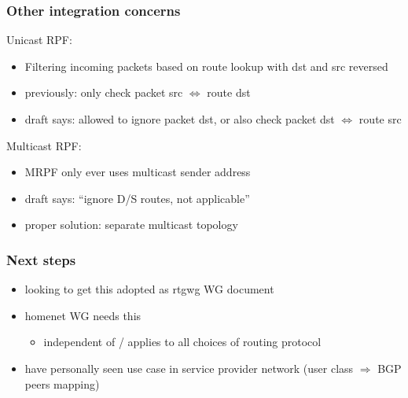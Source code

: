 \documentclass[14pt]{beamer}
\begin{document}
\begin{frame}
  \frametitle{Other integration concerns}

  Unicast RPF:
  \begin{itemize}
    \item Filtering incoming packets based on route lookup with dst and src reversed
    \item previously: only check packet src $\Leftrightarrow$ route dst
    \item draft says: allowed to ignore packet dst, or also check packet dst $\Leftrightarrow$ route src
  \end{itemize}
  \vspace{5mm}
  Multicast RPF:
  \begin{itemize}
    \item MRPF only ever uses multicast sender address
    \item draft says: ``ignore D/S routes, not applicable''
    \item proper solution: separate multicast topology
  \end{itemize}
\end{frame}

\begin{frame}
  \frametitle{Next steps}
  \begin{itemize}
    \item looking to get this adopted as rtgwg WG document
    \item homenet WG needs this
    \begin{itemize}
      \item independent of / applies to all choices of routing protocol
    \end{itemize}
    \item have personally seen use case in service provider network
       (user class $\Rightarrow$ BGP peers mapping)
  \end{itemize}
\end{frame}
\end{document}

